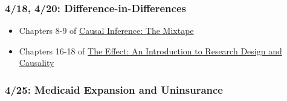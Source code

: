 \documentclass[11pt,]{article}
\providecommand{\tightlist}{%
  \setlength{\itemsep}{0pt}\setlength{\parskip}{0pt}}
\begin{document}
\hypertarget{difference-in-differences}{%
\subsubsection{4/18, 4/20:
Difference-in-Differences}\label{difference-in-differences}}

\begin{itemize}
\tightlist
\item
  Chapters 8-9 of \href{https://mixtape.scunning.com/}{Causal Inference:
  The Mixtape}
\item
  Chapters 16-18 of \href{https://theeffectbook.net/}{The Effect: An
  Introduction to Research Design and Causality}
\end{itemize}

\hypertarget{medicaid-expansion-and-uninsurance}{%
\subsubsection{4/25: Medicaid Expansion and
Uninsurance}\label{medicaid-expansion-and-uninsurance}}
\end{document}
